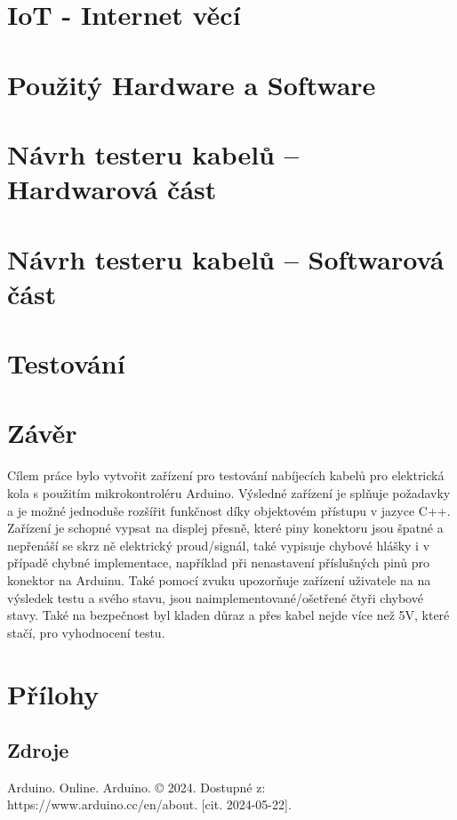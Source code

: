 \documentclass[12pt,a4paper,titlepage]{scrreprt}
\begin{document}
	\chapter{IoT - Internet věcí}
	
	
	
	
	\chapter{Použitý Hardware a Software}
	
	
	
	
	
	
	\chapter{Návrh testeru kabelů – Hardwarová část}
	
	
	\chapter{Návrh testeru kabelů – Softwarová část}
	
	
	
	
	\chapter{Testování}
	
	
	
	\chapter{Závěr}
	Cílem práce bylo vytvořit zařízení pro testování nabíjecích kabelů pro elektrická kola s použitím mikrokontroléru Arduino. Výsledné zařízení je splňuje požadavky a je možné jednoduše rozšířit funkčnost díky objektovém přístupu v jazyce C++. Zařízení je schopné vypsat na displej přesně, které piny konektoru jsou špatné a nepřenáší se skrz ně elektrický proud/signál, také vypisuje chybové hlášky i v případě chybné implementace, například při nenastavení příslušných pinů pro konektor na Arduinu. Také pomocí zvuku upozorňuje zařízení uživatele na na výsledek testu a svého stavu, jsou naimplementované/ošetřené čtyři chybové stavy. Také na bezpečnost byl kladen důraz a přes kabel nejde více než 5V, které stačí, pro vyhodnocení testu.

	\newpage
	\chapter{Přílohy}
	
	\section*{Zdroje}
	Arduino. Online. Arduino. © 2024. Dostupné z: https://www.arduino.cc/en/about. [cit. 2024-05-22].
	
\end{document}
